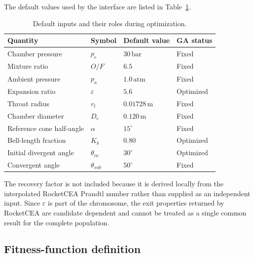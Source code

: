 The default values used by the interface are listed in
Table~\ref{tab:ga_inputs_updated}.

\begin{table}[htbp]
\centering
\caption{Default inputs and their roles during optimization.}
\label{tab:ga_inputs_updated}
\begin{tabular}{llll}
\toprule
Quantity & Symbol & Default value & GA status \\
\midrule
Chamber pressure          & \(p_c\)          & \(30\,\mathrm{bar}\)    & Fixed \\
Mixture ratio             & \(O/F\)          & \(6.5\)                  & Fixed \\
Ambient pressure          & \(p_a\)          & \(1.0\,\mathrm{atm}\)   & Fixed \\
Expansion ratio           & \(\varepsilon\)  & \(5.6\)                  & Optimized \\
Throat radius             & \(r_t\)          & \(0.01728\,\mathrm{m}\) & Fixed \\
Chamber diameter          & \(D_c\)          & \(0.120\,\mathrm{m}\)  & Fixed \\
Reference cone half-angle & \(\alpha\)       & \(15^\circ\)            & Fixed \\
Bell-length fraction      & \(K_b\)          & \(0.80\)                 & Optimized \\
Initial divergent angle   & \(\theta_{in}\)  & \(30^\circ\)            & Optimized \\
Convergent angle          & \(\theta_{sub}\) & \(50^\circ\)            & Fixed \\
\bottomrule
\end{tabular}
\end{table}

The recovery factor is not included because it is derived locally from the
interpolated RocketCEA Prandtl number rather than supplied as an independent input.
Since \(\varepsilon\) is
part of the chromosome, the exit properties returned by RocketCEA are candidate
dependent and cannot be treated as a single common result for the complete population.

\subsection{Fitness-function definition}

